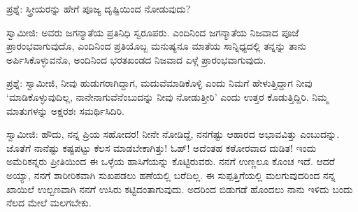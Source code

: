 ಪ್ರಶ್ನೆ: ಸ್ತ್ರೀಯರನ್ನು ಹೇಗೆ ಪೂಜ್ಯ ದೃಷ್ಟಿಯಿಂದ ನೋಡುವುದು?

ಸ್ವಾಮೀಜಿ: ಅವರು ಜಗನ್ಮಾತೆಯ ಪ್ರತಿನಿಧಿ ಸ್ವರೂಪರು. ಎಂದಿನಿಂದ ಜಗನ್ಮಾತೆಯ ನಿಜವಾದ ಪೂಜೆ ಪ್ರಾರಂಭವಾಗುವುದೊ, ಎಂದಿನಿಂದ ಪ್ರತಿಯೊಬ್ಬ ಮನುಷ್ಯನೂ ಮಾತೆಯ ಸಾನ್ನಿಧ್ಯದಲ್ಲಿ ತನ್ನನ್ನು ತಾನು ಅರ್ಪಿಸಿಕೊಳ್ಳುವನೊ, ಅಂದಿನಿಂದ ಭರತಖಂಡದ ನಿಜವಾದ ಏಳ್ಗೆ ಪ್ರಾರಂಭವಾಗುವುದು.

ಪ್ರಶ್ನೆ: ಸ್ವಾಮೀಜಿ, ನೀವು ಹುಡುಗರಾಗಿದ್ದಾಗ, ಮದುವೆಮಾಡಿಕೊಳ್ಳಿ ಎಂದು ನಿಮಗೆ ಹೇಳುತ್ತಿದ್ದಾಗ ನೀವು ‘ಮಾಡಿಕೊಳ್ಳುವುದಿಲ್ಲ, ನಾನೇನಾಗುವೆನೆಂಬುದನ್ನು ನೀವು ನೋಡುತ್ತೀರಿ’ ಎಂದು ಉತ್ತರ ಕೊಡುತ್ತಿದ್ದಿರಿ. ನಿಮ್ಮ ಮಾತುಗಳನ್ನು ಅಕ್ಷರಶಃ ಸಮರ್ಥಿಸಿದಿರಿ.

ಸ್ವಾಮೀಜಿ: ಹೌದು, ನನ್ನ ಪ್ರಿಯ ಸಹೋದರ! ನೀನೇ ನೋಡಿದ್ದೆ, ನನಗೆಷ್ಟು ಆಹಾರದ ಅಭಾವವಿತ್ತು ಎಂಬುದನ್ನು. ಜೊತೆಗೆ ನಾನೆಷ್ಟು ಕಷ್ಟಪಟ್ಟು ಕೆಲಸ ಮಾಡಬೇಕಾಗಿತ್ತು! ಓಹ್! ಅದೆಂತಹ ಕಠೋರವಾದ ದುಡಿತ! ಇಂದು ಅಮೆರಿಕನ್ನರು ಪ್ರೀತಿಯಿಂದ ಈ ಒಳ್ಳೆಯ ಹಾಸಿಗೆಯನ್ನು ಕೊಟ್ಟಿರುವರು. ನನಗೆ ಉಣ್ಣಲೂ ಕೊಂಚ ಇದೆ. ಆದರೆ ಅಯ್ಯಾ, ನನಗೆ ಶಾರೀರಿಕವಾಗಿ ಸುಖಪಡಲು ಹಣೆಯಲ್ಲಿ ಬರೆದಿಲ್ಲ. ಈ ಸುಪ್ಪತ್ತಿಗೆಯಲ್ಲಿ ಮಲಗುವುದರಿಂದ ನನ್ನ ಖಾಯಿಲೆ ಉಲ್ಬಣವಾಗಿ ನನಗೆ ಉಸಿರು ಕಟ್ಟಿದಂತಾಗುವುದು. ಅದರಿಂದ ಬಿಡುಗಡೆ ಹೊಂದಲು ನಾನು ಇಳಿದು ಬಂದು ನೆಲದ ಮೇಲೆ ಮಲಗಬೇಕು.

